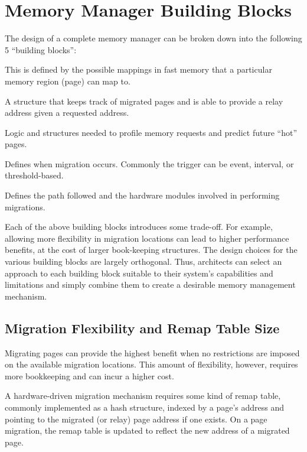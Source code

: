 \section{Memory Manager Building Blocks}

The design of a complete memory manager can be broken down into the following 5 ``building blocks'':
\begin{description}[style=unboxed,leftmargin=0cm]
\setlength\itemsep{0em}
\item [Migration flexibility:] This is defined by the possible mappings in 
fast memory that a particular memory region (page) can map to.
\item [Remap table:] A structure that keeps track of migrated pages and is able to provide a relay address given a requested address.
\item [Activity tracking:] Logic and structures needed to profile memory requests and predict future ``hot'' pages.
\item [Migration trigger:] Defines when migration occurs. Commonly the trigger can be event, interval, or threshold-based.
\item [Migration driver/datapath:] Defines the path followed and the hardware modules involved in performing migrations.
\end{description}

Each of the above building blocks introduces some trade-off. For example, allowing more flexibility in migration locations can lead to higher performance benefits, at the cost of larger book-keeping structures.  The design choices for the various building blocks are largely
orthogonal.  Thus, architects can select an approach to each building block suitable to their system's capabilities and limitations and simply combine them to create a desirable memory management mechanism.

\subsection{Migration Flexibility and Remap Table Size}
\label{sec:relocation}

Migrating pages can provide the highest benefit when no restrictions are imposed on the available migration locations.  This amount of flexibility, however,
requires more bookkeeping and can incur a higher cost.

A hardware-driven migration mechanism requires some kind of remap table,
commonly implemented as a hash structure, indexed by a page's address and pointing to the migrated (or relay) page address if one exists. On a page migration, the remap table is updated to reflect the new address of a migrated page. 

